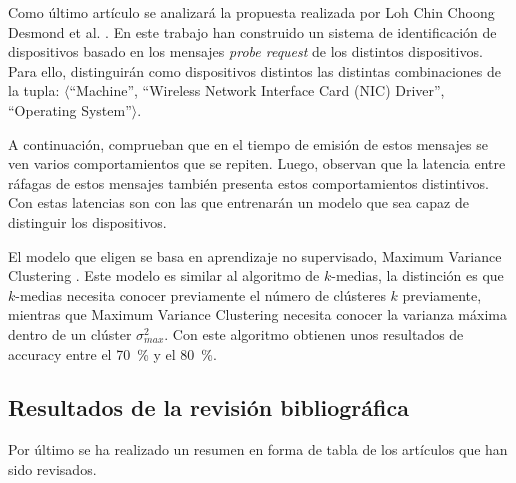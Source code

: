 Como último artículo se analizará la propuesta realizada por Loh Chin Choong Desmond et al. \cite{desmond2008identifying}. En este trabajo han construido un sistema de identificación de dispositivos basado en los mensajes \textit{probe request} de los distintos dispositivos. Para ello, distinguirán como dispositivos distintos las distintas combinaciones de la tupla: $\langle$``Machine'', ``Wireless Network Interface Card (NIC) Driver'', ``Operating System''$\rangle$.

A continuación, comprueban que en el tiempo de emisión de estos mensajes se ven varios comportamientos que se repiten. Luego, observan que la latencia entre ráfagas de estos mensajes también presenta estos comportamientos distintivos. Con estas latencias son con las que entrenarán un modelo que sea capaz de distinguir los dispositivos.

El modelo que eligen se basa en aprendizaje no supervisado, Maximum Variance Clustering \cite{veenman2002maximum}. Este modelo es similar al algoritmo de $k$-medias, la distinción es que $k$-medias necesita conocer previamente el número de clústeres $k$ previamente, mientras que Maximum Variance Clustering necesita conocer la varianza máxima dentro de un clúster $\sigma^2_{max}$. Con este algoritmo obtienen unos resultados de accuracy entre el \SI{70}{\percent} y el \SI{80}{\percent}.


\subsection{Resultados de la revisión bibliográfica}

Por último se ha realizado un resumen en forma de tabla de los artículos que han sido revisados. 

